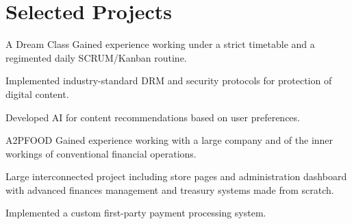 \section{Selected Projects}

\begin{experience}{A Dream Class}{
}
Gained experience working under a strict timetable and a regimented daily SCRUM/Kanban routine.

\begin{contribs}
	\item{Implemented industry-standard DRM and security protocols for protection of digital content.}
	\item{Developed AI for content recommendations based on user preferences.}
\end{contribs}
\end{experience}

\begin{experience}{A2PFOOD}{
}
Gained experience working with a large company and of the inner workings of conventional financial operations.

\begin{contribs}
	\item{Large interconnected project including store pages and administration dashboard with advanced finances management and treasury systems made from scratch.}
	\item{Implemented a custom first-party payment processing system.}
\end{contribs}
\end{experience}
